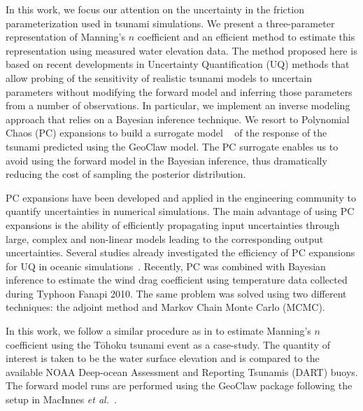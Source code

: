 \documentclass[review,12pt]{elsarticle}
\newcommand{\geoclaw}{{\sc GeoClaw}\xspace}
\newcommand{\tohoku}{T\={o}hoku\xspace}
\begin{document}
In this work, we focus our attention on the uncertainty in the friction
parameterization used in tsunami simulations. We present a three-parameter 
representation of Manning's $n$ coefficient and an efficient method
to estimate this representation using measured water elevation data. The method proposed here 
is based on recent developments in Uncertainty Quantification (UQ) methods that allow 
probing of the sensitivity of realistic tsunami  models to uncertain parameters
without modifying the forward model and inferring those parameters
from a number of observations.  In particular, we implement an inverse modeling
approach that relies on a Bayesian inference technique.  We resort to
Polynomial Chaos (PC) expansions to build a surrogate model ~\cite{Najm:2009,Alexanderian2012,Elsheikh2014,Young2013}
of the response of the tsunami predicted using the \geoclaw model.
The PC surrogate enables us to avoid using the forward model in
the Bayesian inference, thus dramatically reducing the cost of sampling the
posterior distribution.

PC expansions have been developed and applied in the engineering community to
quantify uncertainties in numerical simulations.  The main advantage of
using PC expansions is the ability of efficiently propagating input uncertainties through 
large, complex and non-linear models leading to the corresponding output uncertainties. 
Several studies already investigated the efficiency of PC expansions for 
UQ in oceanic simulations~\citep{thacker2012,ashwanth2010,Alexanderian2012,sraj:2013a}. 
Recently, PC was combined with Bayesian inference to estimate the wind drag coefficient 
using temperature data collected during Typhoon Fanapi 2010. The same problem was 
solved using two different techniques: the adjoint method and Markov Chain Monte Carlo
(MCMC)\cite{sraj:2013a,sraj:2013b}.

In this work, we follow a similar procedure as in \cite{sraj:2013a,sraj:2013b}
to estimate Manning's $n$ coefficient using the \tohoku tsunami
event as a case-study. The quantity of interest is taken to be the water surface
elevation and is compared to the available NOAA Deep-ocean Assessment and
Reporting Tsunamis (DART) buoys.  The forward model runs are performed using the
\geoclaw package following the setup in MacInnes \emph{et al.}~\cite{MacInnes:2013cr}.
\end{document}
